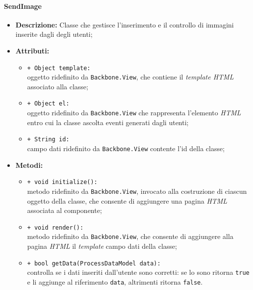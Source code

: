 \paragraph{SendImage}
\begin{flushleft}
\begin{itemize}
\item \textbf{Descrizione:} Classe che gestisce l'inserimento e il controllo di immagini inserite dagli degli utenti;
\item \textbf{Attributi:}
\begin{sloppypar}
\begin{itemize}
\item \texttt{+ Object template:}\\ oggetto ridefinito da \texttt{Backbone.View}, che contiene il \textit{template HTML} associato alla classe;
\item \texttt{+ Object el:}\\ oggetto ridefinito da \texttt{Backbone.View} che rappresenta l'elemento \textit{HTML} entro cui la classe ascolta eventi generati dagli utenti;
\item \texttt{+ String id:}\\ campo dati ridefinito da \texttt{Backbone.View} contente l'id della classe;
\end{itemize}
\end{sloppypar}
\item \textbf{Metodi:}
\begin{sloppypar}
\begin{itemize}
\item \texttt{+ void initialize():}\\ metodo ridefinito da \texttt{Backbone.View}, invocato alla costruzione di ciascun oggetto della classe, che consente di aggiungere una pagina \textit{HTML} associata al componente;
\item \texttt{+ void render():}\\ metodo ridefinito da \texttt{Backbone.View}, che consente di aggiungere alla pagina \textit{HTML} il \textit{template} campo dati della classe;
\item \texttt{+ bool getData(ProcessDataModel data):}\\ controlla se i dati inseriti dall'utente sono corretti: se lo sono ritorna \texttt{true} e li aggiunge al riferimento \texttt{data}, altrimenti ritorna \texttt{false}.
\end{itemize}
\end{sloppypar}
\end{itemize}
\end{flushleft}

